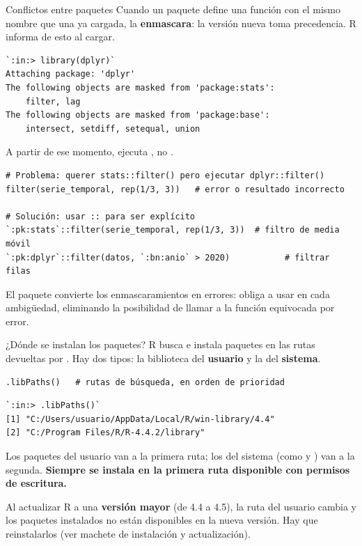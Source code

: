 \documentclass[8pt]{beamer}
\begin{document}
	\begin{frame}[fragile]{Conflictos entre paquetes}
		Cuando un paquete define una función con el mismo nombre que una ya cargada, la \textbf{enmascara}: la versión nueva toma precedencia. R informa de esto al cargar.

\begin{lstlisting}[style=RConsole]
`:in:> library(dplyr)`
Attaching package: 'dplyr'
The following objects are masked from 'package:stats':
    filter, lag
The following objects are masked from 'package:base':
    intersect, setdiff, setequal, union
\end{lstlisting}

		A partir de ese momento,  ejecuta , no .

\begin{lstlisting}[style=RScript]
# Problema: querer stats::filter() pero ejecutar dplyr::filter()
filter(serie_temporal, rep(1/3, 3))   # error o resultado incorrecto

# Solución: usar :: para ser explícito
`:pk:stats`::filter(serie_temporal, rep(1/3, 3))  # filtro de media móvil
`:pk:dplyr`::filter(datos, `:bn:anio` > 2020)           # filtrar filas
\end{lstlisting}

		\begin{block}{}
			El paquete  convierte los enmascaramientos en errores: obliga a usar \rscript{::} en cada ambigüedad, eliminando la posibilidad de llamar a la función equivocada por error.
		\end{block}
	\end{frame}


	\begin{frame}[fragile]{¿Dónde se instalan los paquetes?}
		R busca e instala paquetes en las rutas devueltas por . Hay dos tipos: la biblioteca del \textbf{usuario} y la del \textbf{sistema}.

\begin{lstlisting}[style=RScript]
.libPaths()   # rutas de búsqueda, en orden de prioridad
\end{lstlisting}
\begin{lstlisting}[style=RConsole]
`:in:> .libPaths()`
[1] "C:/Users/usuario/AppData/Local/R/win-library/4.4"
[2] "C:/Program Files/R/R-4.4.2/library"
\end{lstlisting}

		Los paquetes del usuario van a la primera ruta; los del sistema (como  y ) van a la segunda. \textbf{Siempre se instala en la primera ruta disponible con permisos de escritura.}

		\begin{alertblock}{}
			Al actualizar R a una \textbf{versión mayor} (de 4.4 a 4.5), la ruta del usuario cambia y los paquetes instalados no están disponibles en la nueva versión. Hay que reinstalarlos (ver machete de instalación y actualización).
		\end{alertblock}
	\end{frame}
\end{document}
